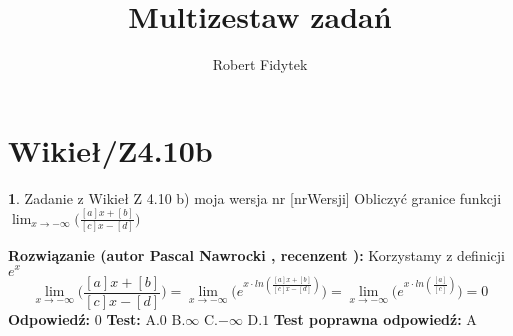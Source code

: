 \documentclass[12pt, a4paper]{article}
\title{Multizestaw zadań}
\author{Robert Fidytek}
\date{}
\theoremstyle{definition} %
\newtheorem{zad}{}
\newcommand{\kategoria}[1]{\section{#1}} %
\newcommand{\zadStart}[1]{\begin{zad}#1\newline} %
\newcommand{\zadStop}{\end{zad}}   %
\newcommand{\rozwStart}[2]{\noindent \textbf{Rozwiązanie (autor #1 , recenzent #2): }\newline} %
\newcommand{\odpStart}{\noindent \textbf{Odpowiedź:}\newline}    %
\newcommand{\odpStop}{\newline}                                             %
\newcommand{\testStart}{\noindent \textbf{Test:}\newline} %
\newcommand{\testStop}{\newline} %
\newcommand{\kluczStart}{\noindent \textbf{Test poprawna odpowiedź:}\newline} %
\newcommand{\kluczStop}{\newline} %
\begin{document}
\maketitle


\kategoria{Wikieł/Z4.10b}
\zadStart{Zadanie z Wikieł Z 4.10 b) moja wersja nr [nrWersji]}
Obliczyć granice funkcji $\displaystyle{\lim_{x \to -\infty}}\bigg(\frac{[a]x+[b]}{[c]x-[d]}\bigg)$
\zadStop
\rozwStart{Pascal Nawrocki}{}
Korzystamy z definicji $e^x$
$$\displaystyle{\lim_{x \to -\infty}}\bigg(\frac{[a]x+[b]}{[c]x-[d]}\bigg)= \displaystyle{\lim_{x \to -\infty}}\big(e^{x\cdot ln(\frac{[a]x+[b]}{[c]x-[d]})}\big)=\displaystyle{\lim_{x \to -\infty}}\big(e^{x\cdot ln(\frac{[a]}{[c]})}\big)=0$$
\odpStart
$0$
\odpStop
\testStart
A.$0$
B.$\infty$
C.$-\infty$
D.$1$
\testStop
\kluczStart
A
\kluczStop
\end{document}
